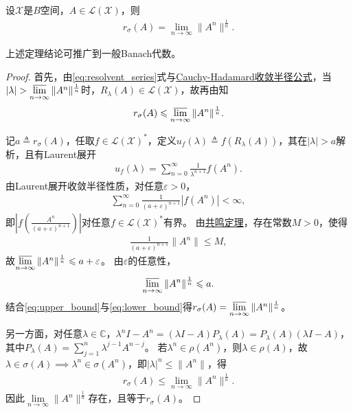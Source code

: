 \documentclass[../../main.tex]{subfiles}%
\begin{document}
\begin{theorem}[Gelfand定理]\label{theorem:泛函分析--Gelfand定理}
设$\mathscr{X}$是$B$空间，$A\in\mathscr{L}(\mathscr{X})$，则
\begin{align}
r_{\sigma}(A)=\lim\limits_{n\to\infty}\|A^n\|^{\frac{1}{n}}.\label{eq:gelfand_formula}
\end{align}
\end{theorem}
\begin{remark}
上述定理结论可推广到一般Banach代数。
\end{remark}
\begin{proof}
首先，由\eqref{eq:resolvent_series}式与\hyperref[Complex Analysis-theorem:Cauchy-Hadamard收敛半径公式]{Cauchy-Hadamard收敛半径公式}，当$|\lambda|>\varlimsup\limits_{n\to\infty}\|A^n\|^{\frac{1}{n}}$时，$R_{\lambda}(A)\in\mathscr{L}(\mathscr{X})$，故再由知
\begin{align}
r_{\sigma}(A)\leqslant\varlimsup\limits_{n\to\infty}\|A^n\|^{\frac{1}{n}}.\label{eq:upper_bound}
\end{align}

记$a\triangleq r_{\sigma}(A)$，任取$f\in\mathscr{L}(\mathscr{X})^*$，定义$u_f(\lambda)\triangleq f(R_{\lambda}(A))$，其在$|\lambda|>a$解析，且有Laurent展开
\begin{align*}
u_f(\lambda)=\sum\limits_{n=0}^{\infty}\frac{1}{\lambda^{n+1}}f(A^n).
\end{align*}
由Laurent展开收敛半径性质，对任意$\varepsilon>0$，
\begin{align*}
\sum\limits_{n=0}^{\infty}\frac{1}{(a+\varepsilon)^{n+1}}|f(A^n)|<\infty,
\end{align*}
即$\left|f\left(\frac{A^n}{(a+\varepsilon)^{n+1}}\right)\right|$对任意$f\in\mathscr{L}(\mathscr{X})^*$有界。
由\hyperref[theorem:泛函分析--共鸣定理]{共鸣定理}，存在常数$M>0$，使得
\begin{align*}
\frac{1}{(a+\varepsilon)^{n+1}}\|A^n\|\leqslant M,
\end{align*}
故$\varlimsup\limits_{n\to\infty}\|A^n\|^{\frac{1}{n}}\leqslant a+\varepsilon$。
由$\varepsilon$的任意性，
\begin{align}
\varlimsup\limits_{n\to\infty}\|A^n\|^{\frac{1}{n}}\leqslant a.\label{eq:lower_bound}
\end{align}
结合\eqref{eq:upper_bound}与\eqref{eq:lower_bound}得$r_{\sigma}(A)=\varlimsup\limits_{n\to\infty}\|A^n\|^{\frac{1}{n}}$。

另一方面，对任意$\lambda\in\mathbb{C}$，$\lambda^n I-A^n=(\lambda I-A)P_{\lambda}(A)=P_{\lambda}(A)(\lambda I-A)$，其中$P_{\lambda}(A)=\sum\limits_{j=1}^{n}\lambda^{j-1}A^{n-j}$。
若$\lambda^n\in\rho(A^n)$，则$\lambda\in\rho(A)$，故$\lambda\in\sigma(A)\implies\lambda^n\in\sigma(A^n)$，即$|\lambda|^n\leqslant\|A^n\|$，得
\begin{align}
r_{\sigma}(A)\leqslant\lim\limits_{n\to\infty}\|A^n\|^{\frac{1}{n}}.\label{eq:lim_bound}
\end{align}
因此$\lim\limits_{n\to\infty}\|A^n\|^{\frac{1}{n}}$存在，且等于$r_{\sigma}(A)$。
\end{proof}
\end{document}
